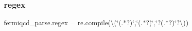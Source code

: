 \mbox{\label{namespacefermiqcd__parse_a138bf81b566ae24af8ee02b0e5dbcabe}} 
\subsubsection{\texorpdfstring{regex}{regex}}
{\footnotesize\ttfamily fermiqcd\+\_\+parse.\+regex = re.\+compile(\textquotesingle{}\textbackslash{}(\char`\"{}(.$\ast$?)\char`\"{},\char`\"{}(.$\ast$?)\char`\"{},\char`\"{}?(.$\ast$?)\char`\"{}?\textbackslash{})\textquotesingle{})}

